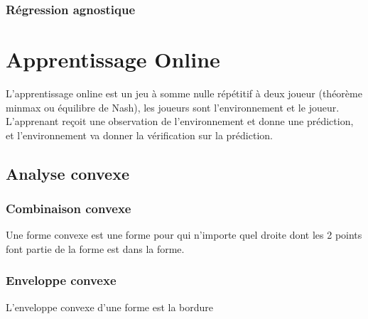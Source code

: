 \subsection{Régression agnostique}

\pagebreak
\chapter{Apprentissage Online}

L'apprentissage online est un jeu à somme nulle répétitif à deux joueur (théorème minmax ou équilibre de Nash), les joueurs sont l'environnement et le joueur.\\
L'apprenant reçoit une observation de l'environnement et donne une prédiction, et l'environnement va donner la vérification sur la prédiction.\\

\pagebreak
\section{Analyse convexe}
\subsection{Combinaison convexe}

Une forme convexe est une forme pour qui n'importe quel droite dont les 2 points font partie de la forme est dans la forme.\\

\begin{center}
\end{center}

\subsection{Enveloppe convexe}

L'enveloppe convexe d'une forme est la bordure\\
\begin{center}
\end{center}

